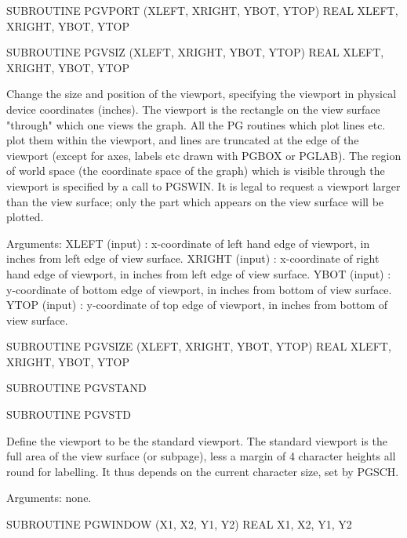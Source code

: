 {\eightpoint\begintt
      SUBROUTINE PGVPORT (XLEFT, XRIGHT, YBOT, YTOP)
      REAL XLEFT, XRIGHT, YBOT, YTOP
\endtt}

{\eightpoint\begintt
      SUBROUTINE PGVSIZ (XLEFT, XRIGHT, YBOT, YTOP)
      REAL XLEFT, XRIGHT, YBOT, YTOP
 
Change the size and position of the viewport, specifying
the viewport in physical device coordinates (inches).  The
viewport is the rectangle on the view surface "through"
which one views the graph.  All the PG routines which plot lines
etc. plot them within the viewport, and lines are truncated at
the edge of the viewport (except for axes, labels etc drawn with
PGBOX or PGLAB).  The region of world space (the coordinate
space of the graph) which is visible through the viewport is
specified by a call to PGSWIN.  It is legal to request a
viewport larger than the view surface; only the part which
appears on the view surface will be plotted.
 
Arguments:
 XLEFT  (input)  : x-coordinate of left hand edge of viewport, in
                   inches from left edge of view surface.
 XRIGHT (input)  : x-coordinate of right hand edge of viewport, in
                   inches from left edge of view surface.
 YBOT   (input)  : y-coordinate of bottom edge of viewport, in
                   inches from bottom of view surface.
 YTOP   (input)  : y-coordinate of top  edge of viewport, in inches
                   from bottom of view surface.
\endtt}

{\eightpoint\begintt
      SUBROUTINE PGVSIZE (XLEFT, XRIGHT, YBOT, YTOP)
      REAL XLEFT, XRIGHT, YBOT, YTOP
\endtt}

{\eightpoint\begintt
      SUBROUTINE PGVSTAND
\endtt}

{\eightpoint\begintt
      SUBROUTINE PGVSTD
 
Define the viewport to be the standard viewport.  The standard
viewport is the full area of the view surface (or subpage),
less a margin of 4 character heights all round for labelling.
It thus depends on the current character size, set by PGSCH.
 
Arguments: none.
\endtt}

{\eightpoint\begintt
      SUBROUTINE PGWINDOW (X1, X2, Y1, Y2)
      REAL X1, X2, Y1, Y2
\endtt}

